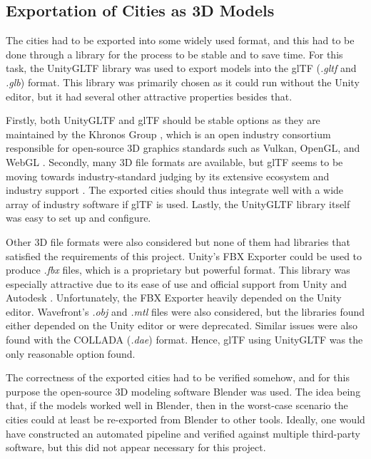\subsection{Exportation of Cities as 3D Models}

The cities had to be exported into some widely used format, and this had to be done through a library for the process to be stable and to save time.
For this task, the UnityGLTF \cite{unity_gltf} library was used to export models into the glTF (\textit{.gltf} and \textit{.glb}) \cite{gltf} format.
This library was primarily chosen as it could run without the Unity editor, but it had several other attractive properties besides that.

Firstly, both UnityGLTF and glTF should be stable options as they are maintained by the Khronos Group \cite{unity_gltf} \cite{gltf}, which is an open industry consortium responsible for open-source 3D graphics standards such as Vulkan, OpenGL, and WebGL \cite{khronos_about}.
Secondly, many 3D file formats are available, but glTF seems to be moving towards industry-standard judging by its extensive ecosystem and industry support \cite{gltf}.
The exported cities should thus integrate well with a wide array of industry software if glTF is used.
Lastly, the UnityGLTF library itself was easy to set up and configure.

Other 3D file formats were also considered but none of them had libraries that satisfied the requirements of this project.
Unity's FBX Exporter \cite{fbxexporter} could be used to produce \textit{.fbx} \cite{fbx} files, which is a proprietary but powerful format.
This library was especially attractive due to its ease of use and official support from Unity and Autodesk \cite{fbxexporter}.
Unfortunately, the FBX Exporter heavily depended on the Unity editor.
Wavefront's \textit{.obj} \cite{obj_files} and \textit{.mtl} \cite{mtl_files} files were also considered, but the libraries found either depended on the Unity editor or were deprecated.
Similar issues were also found with the COLLADA (\textit{.dae}) \cite{collada_files} format.
Hence, glTF using UnityGLTF was the only reasonable option found.

The correctness of the exported cities had to be verified somehow, and for this purpose the open-source 3D modeling software Blender \cite{blender} was used. 
The idea being that, if the models worked well in Blender, then in the worst-case scenario the cities could at least be re-exported from Blender to other tools.
Ideally, one would have constructed an automated pipeline and verified against multiple third-party software, but this did not appear necessary for this project.